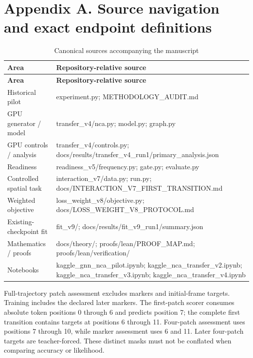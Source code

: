 \documentclass[11pt,a4paper]{article}
\begin{document}
\section*{Appendix A. Source navigation and exact endpoint definitions}
{\small
\begin{longtable}{>{\raggedright\arraybackslash}p{}>{\raggedright\arraybackslash}p{}}
\caption{Canonical sources accompanying the manuscript}\\
\toprule
\textbf{Area} & \textbf{Repository-relative source} \\
\midrule\endfirsthead
\toprule
\textbf{Area} & \textbf{Repository-relative source} \\
\midrule\endhead
\bottomrule\endlastfoot
Historical pilot & experiment.py; METHODOLOGY\_\allowbreak{}AUDIT.md \\
GPU generator /\allowbreak{} model & transfer\_\allowbreak{}v4/\allowbreak{}nca.py; model.py; graph.py \\
GPU controls /\allowbreak{} analysis & transfer\_\allowbreak{}v4/\allowbreak{}controls.py; docs/\allowbreak{}results/\allowbreak{}transfer\_\allowbreak{}v4\_\allowbreak{}run1/\allowbreak{}primary\_\allowbreak{}analysis.json \\
Readiness & readiness\_\allowbreak{}v5/\allowbreak{}frequency.py; gate.py; evaluate.py \\
Controlled spatial task & interaction\_\allowbreak{}v7/\allowbreak{}data.py; run.py; docs/\allowbreak{}INTERACTION\_\allowbreak{}V7\_\allowbreak{}FIRST\_\allowbreak{}TRANSITION.md \\
Weighted objective & loss\_\allowbreak{}weight\_\allowbreak{}v8/\allowbreak{}objective.py; docs/\allowbreak{}LOSS\_\allowbreak{}WEIGHT\_\allowbreak{}V8\_\allowbreak{}PROTOCOL.md \\
Existing-checkpoint fit & fit\_\allowbreak{}v9/\allowbreak{}; docs/\allowbreak{}results/\allowbreak{}fit\_\allowbreak{}v9\_\allowbreak{}run1/\allowbreak{}summary.json \\
Mathematics /\allowbreak{} proofs & docs/\allowbreak{}theory/\allowbreak{}; proofs/\allowbreak{}lean/\allowbreak{}PROOF\_\allowbreak{}MAP.md; proofs/\allowbreak{}lean/\allowbreak{}verification/\allowbreak{} \\
Notebooks & kaggle\_\allowbreak{}gnn\_\allowbreak{}nca\_\allowbreak{}pilot.ipynb; kaggle\_\allowbreak{}nca\_\allowbreak{}transfer\_\allowbreak{}v2.ipynb; kaggle\_\allowbreak{}nca\_\allowbreak{}transfer\_\allowbreak{}v3.ipynb; kaggle\_\allowbreak{}nca\_\allowbreak{}transfer\_\allowbreak{}v4.ipynb \\
\end{longtable}
}
Full-trajectory patch assessment excludes markers and initial-frame targets. Training includes the declared later markers. The first-patch scorer consumes absolute token positions 0 through 6 and predicts position 7; the complete first transition contains targets at positions 6 through 11. Four-patch assessment uses positions 7 through 10, while marker assessment uses 6 and 11. Later four-patch targets are teacher-forced. These distinct masks must not be conflated when comparing accuracy or likelihood.
\end{document}
